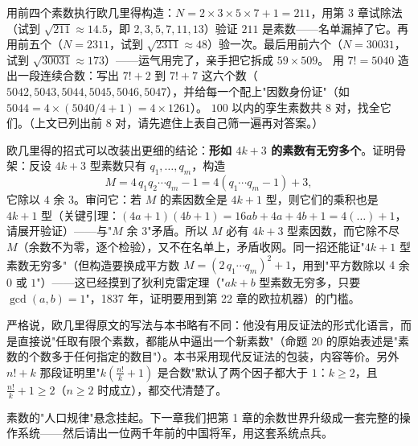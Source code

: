 \begin{dongshou}
\begin{itemize}
  \yisi 用前四个素数执行欧几里得构造：$N = 2\times3\times5\times7+1 = 211$，用第 3 章试除法（试到 $\sqrt{211} \approx 14.5$，即 $2,3,5,7,11,13$）验证 $211$ 是素数——名单漏掉了它。再用前五个（$N = 2311$，试到 $\sqrt{2311}\approx 48$）验一次。最后用前六个（$N = 30031$，试到 $\sqrt{30031} \approx 173$）——运气用完了，亲手把它拆成 $59\times509$。
  \yier 用 $7! = 5040$ 造出一段连续合数：写出 $7!+2$ 到 $7!+7$ 这六个数（$5042, 5043, 5044, 5045, 5046, 5047$），并给每一个配上"因数身份证"（如 $5044 = 4\times(5040/4+1) = 4\times1261$）。
  \yier $100$ 以内的孪生素数共 $8$ 对，找全它们。（上文已列出前 $8$ 对，请先遮住上表自己筛一遍再对答案。）
\end{itemize}
\end{dongshou}

\begin{shaonao}
欧几里得的招式可以改装出更细的结论：\textbf{形如 $4k+3$ 的素数有无穷多个}。证明骨架：反设 $4k+3$ 型素数只有 $q_1, \dots, q_m$，构造
\[
M = 4\,q_1q_2\cdots q_m - 1 = 4(q_1\cdots q_m - 1) + 3 ,
\]
它除以 $4$ 余 $3$。审问它：若 $M$ 的素因数全是 $4k+1$ 型，则它们的乘积也是 $4k+1$ 型（关键引理：$(4a+1)(4b+1) = 16ab+4a+4b+1 = 4(\dots)+1$，请展开验证）——与"$M$ 余 $3$"矛盾。所以 $M$ 必有 $4k+3$ 型素因数，而它除不尽 $M$（余数不为零，逐个检验），又不在名单上，矛盾收网。同一招还能证"$4k+1$ 型素数无穷多"（但构造要换成平方数 $M = (2\,q_1\cdots q_m)^2 + 1$，用到"平方数除以 $4$ 余 $0$ 或 $1$"）——这已经摸到了狄利克雷定理（"$ak+b$ 型素数无穷多，只要 $\gcd(a,b)=1$"，1837 年，证明要用到第 22 章的欧拉机器）的门槛。
\end{shaonao}

\begin{chengshi}
严格说，欧几里得原文的写法与本书略有不同：他没有用反证法的形式化语言，而是直接说"任取有限个素数，都能从中逼出一个新素数"（命题 20 的原始表述是"素数的个数多于任何指定的数目"）。本书采用现代反证法的包装，内容等价。另外 $n!+k$ 那段证明里"$k\left(\frac{n!}{k}+1\right)$ 是合数"默认了两个因子都大于 $1$：$k \ge 2$，且 $\frac{n!}{k} + 1 \ge 2$（$n \ge 2$ 时成立），都交代清楚了。
\end{chengshi}

素数的"人口规律"悬念挂起。下一章我们把第 1 章的余数世界升级成一套完整的操作系统——然后请出一位两千年前的中国将军，用这套系统点兵。
